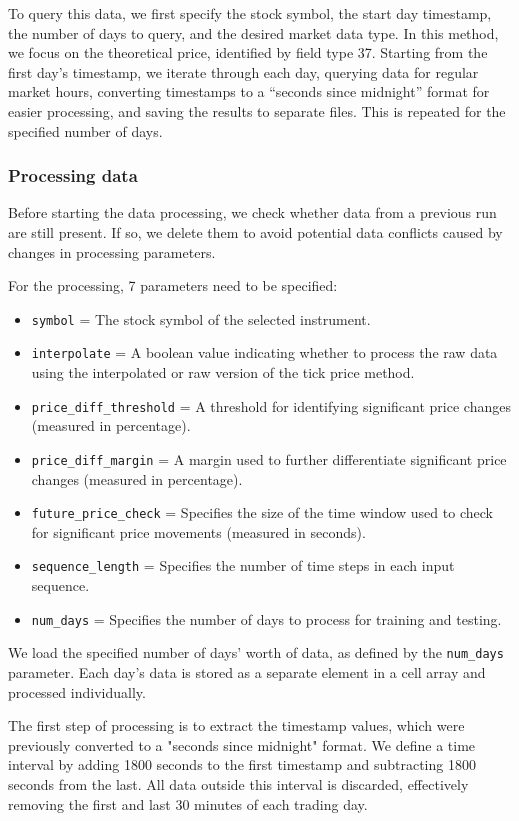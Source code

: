 \documentclass[a4paper,oneside,onecolumn,12pt]{book}
\begin{document}
		To query this data, we first specify the stock symbol, the start day timestamp, the number of days to query, and the desired market data type. In this method, we focus on the theoretical price, identified by field type 37. Starting from the first day's timestamp, we iterate through each day, querying data for regular market hours, converting timestamps to a “seconds since midnight” format for easier processing, and saving the results to separate files. This is repeated for the specified number of days.

		\subsubsection{Processing data}
		Before starting the data processing, we check whether data from a previous run are still present. If so, we delete them to avoid potential data conflicts caused by changes in processing parameters.
		
		For the processing, 7 parameters need to be specified:
		\begin{itemize}
			\item \texttt{symbol} = The stock symbol of the selected instrument.
			\item \texttt{interpolate} = A boolean value indicating whether to process the raw data using the interpolated or raw version of the tick price method.
			\item \texttt{price\_diff\_threshold} = A threshold for identifying significant price changes (measured in percentage).
			\item \texttt{price\_diff\_margin} = A margin used to further differentiate significant price changes (measured in percentage).
			\item \texttt{future\_price\_check} = Specifies the size of the time window used to check for significant price movements (measured in seconds).
			\item \texttt{sequence\_length} = Specifies the number of time steps in each input sequence.
			\item \texttt{num\_days} = Specifies the number of days to process for training and testing.
		\end{itemize}

		We load the specified number of days' worth of data, as defined by the \texttt{num\_days} parameter. Each day's data is stored as a separate element in a cell array and processed individually.

		The first step of processing is to extract the timestamp values, which were previously converted to a "seconds since midnight" format. We define a time interval by adding 1800 seconds to the first timestamp and subtracting 1800 seconds from the last. All data outside this interval is discarded, effectively removing the first and last 30 minutes of each trading day.
		
\end{document}
